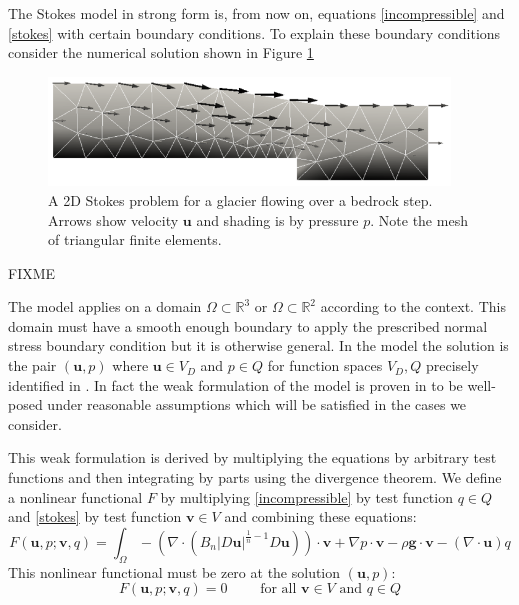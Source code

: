 \documentclass[letterpaper,final,12pt,reqno]{amsart}
\newcommand{\RR}{\mathbb{R}}
\newcommand{\bu}{\mathbf{u}}
\newcommand{\bv}{\mathbf{v}}
\begin{document}
The Stokes model in strong form is, from now on, equations \eqref{incompressible} and \eqref{stokes} with certain boundary conditions.  To explain these boundary conditions consider the numerical solution shown in Figure \ref{fig:stepflowlin}

\begin{figure}
\label{fig:stepflowlin}
\includegraphics[width=0.95\textwidth]{stepflowlin}
\caption{A 2D Stokes problem for a glacier flowing over a bedrock step.  Arrows show velocity $\bu$ and shading is by pressure $p$.  Note the mesh of triangular finite elements.}
\end{figure}

FIXME

The model applies on a domain $\Omega\subset \RR^3$ or $\Omega \subset \RR^2$ according to the context.  This domain must have a smooth enough boundary to apply the prescribed normal stress boundary condition but it is otherwise general.  In the model the solution is the pair $(\bu,p)$ where $\bu\in V_D$ and $p \in Q$ for function spaces $V_D,Q$ precisely identified in \cite{JouvetRappaz2011}.  In fact the weak formulation of the model is proven in \cite{JouvetRappaz2011} to be well-posed under reasonable assumptions which will be satisfied in the cases we consider.

This weak formulation is derived by multiplying the equations by arbitrary test functions and then integrating by parts using the divergence theorem.  We define a nonlinear functional $F$ by multiplying \eqref{incompressible} by test function $q\in Q$ and \eqref{stokes} by test function $\bv\in V$ and combining these equations:
\begin{equation}
F(\bu,p;\bv,q) = \int_\Omega - \left(\nabla \cdot \left(B_n |D\bu|^{\frac{1}{n} - 1} D\bu\right)\right)\cdot \bv + \nabla p \cdot \bv - \rho \mathbf{g} \cdot \bv - \left(\nabla \cdot \bu\right) q \label{nonfuncone}
\end{equation}
This nonlinear functional must be zero at the solution $(\bu,p)$:
\begin{equation}
F(\bu,p;\bv,q) = 0 \qquad \text{ for all } \bv\in V \text{ and } q\in Q
\end{equation}
\end{document}
